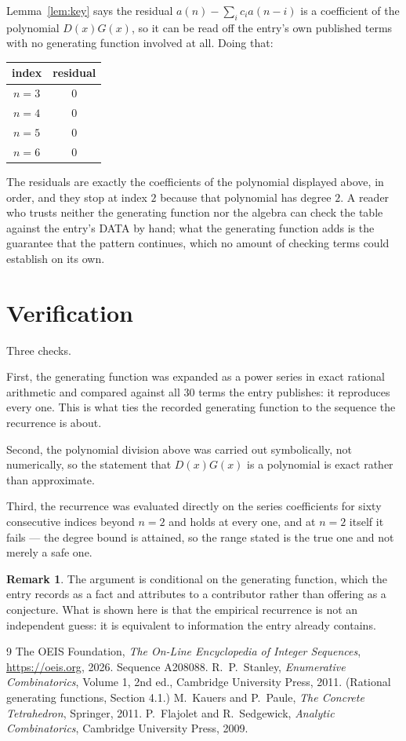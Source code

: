 \documentclass[11pt,a4paper]{article}
\theoremstyle{plain}
\theoremstyle{definition}
\newtheorem{remark}[theorem]{Remark}
\begin{document}
Lemma~\ref{lem:key} says the residual $a(n)-\sum_ic_ia(n-i)$ is a coefficient of the
polynomial $D(x)G(x)$, so it can be read off the entry's own published terms with no
generating function involved at all. Doing that:
\begin{center}
\begin{tabular}{cc}
index & residual \\ \hline
$n=3$ & $0$ \\
$n=4$ & $0$ \\
$n=5$ & $0$ \\
$n=6$ & $0$
\end{tabular}
\end{center}
The residuals are exactly the coefficients of the polynomial displayed above, in order, and
they stop at index $2$ because that polynomial has degree $2$. A reader who trusts
neither the generating function nor the algebra can check the table against the entry's DATA
by hand; what the generating function adds is the guarantee that the pattern continues, which
no amount of checking terms could establish on its own.

\section{Verification}

Three checks.

First, the generating function was expanded as a power series in exact rational arithmetic and
compared against all $30$ terms the entry publishes: it reproduces every one. This is
what ties the recorded generating function to the sequence the recurrence is about.

Second, the polynomial division above was carried out symbolically, not numerically, so the
statement that $D(x)G(x)$ is a polynomial is exact rather than approximate.

Third, the recurrence was evaluated directly on the series coefficients for sixty consecutive
indices beyond $n=2$ and holds at every one, and at $n=2$ itself it fails --- the
degree bound is attained, so the range stated is the true one and not merely a safe one.

\begin{remark}
The argument is conditional on the generating function, which the entry records as a fact and
attributes to a contributor rather than offering as a conjecture. What is shown here is that
the empirical recurrence is not an independent guess: it is equivalent to information the
entry already contains.
\end{remark}

\begin{thebibliography}{9}
 The OEIS Foundation, \emph{The On-Line Encyclopedia of Integer
Sequences}, \url{https://oeis.org}, 2026. Sequence A208088.
 R.~P.~Stanley, \emph{Enumerative Combinatorics}, Volume 1, 2nd ed.,
Cambridge University Press, 2011. (Rational generating functions, Section 4.1.)
 M.~Kauers and P.~Paule, \emph{The Concrete Tetrahedron}, Springer, 2011.
 P.~Flajolet and R.~Sedgewick, \emph{Analytic Combinatorics}, Cambridge
University Press, 2009.
\end{thebibliography}
\end{document}
